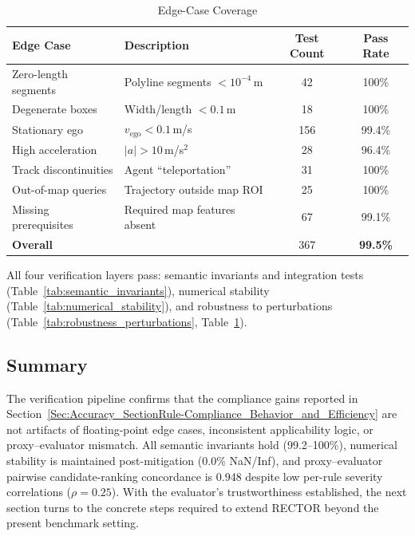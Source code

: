 \begin{table}
\centering
\caption{Edge-Case Coverage}
\label{tab:edge_cases}
\begin{tabular}{llcc}
\toprule
\textbf{Edge Case} & \textbf{Description} & \textbf{Test Count} & \textbf{Pass Rate} \\
\midrule
Zero-length segments & Polyline segments $<\!10^{-4}$\,m & 42 & 100\% \\
Degenerate boxes & Width/length $<\!0.1$\,m & 18 & 100\% \\
Stationary ego & $v_{\text{ego}}{<}0.1$\,m/s & 156 & 99.4\% \\
High acceleration & $|a|{>}10$\,m/s$^2$ & 28 & 96.4\% \\
Track discontinuities & Agent ``teleportation'' & 31 & 100\% \\
Out-of-map queries & Trajectory outside map ROI & 25 & 100\% \\
Missing prerequisites & Required map features absent & 67 & 99.1\% \\
\midrule
\textbf{Overall} & & 367 & \textbf{99.5\%} \\
\bottomrule
\end{tabular}
\end{table}

\noindent
All four verification layers pass: semantic invariants and integration tests (Table~\ref{tab:semantic_invariants}), numerical stability (Table~\ref{tab:numerical_stability}), and robustness to perturbations (Table~\ref{tab:robustness_perturbations}, Table~\ref{tab:edge_cases}).

\subsection{Summary}
\label{subsec:verification_summary}

The verification pipeline confirms that the compliance gains reported in Section~\ref{Sec:Accuracy_SectionRule-Compliance_Behavior_and_Efficiency} are not artifacts of floating-point edge cases, inconsistent applicability logic, or proxy--evaluator mismatch.  All semantic invariants hold (99.2--100\%), numerical stability is maintained post-mitigation (0.0\% NaN/Inf), and proxy--evaluator pairwise candidate-ranking concordance is 0.948 despite low per-rule severity correlations ($\rho{=}0.25$).  With the evaluator's trustworthiness established, the next section turns to the concrete steps required to extend RECTOR beyond the present benchmark setting.